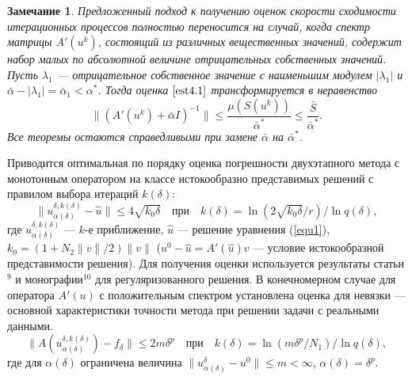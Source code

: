 \documentclass[%
autoref,     %
href,        %
colorlinks,  %
]{disser}
\newtheorem*{remark}{Замечание}
\begin{document}
\begin{remark}%
	Предложенный подход к получению оценок скорости сходимости итерационных процессов полностью переносится на случай, когда спектр матрицы $A'(u^k)$, состоящий из различных вещественных значений, содержит набор малых по абсолютной величине отрицательных собственных значений. Пусть $\lambda _1$ --- отрицательное собственное значение с наименьшим модулем $|\lambda_1|$ и $\bar\alpha -|\lambda _1|=\bar\alpha _1<\alpha^*$. Тогда оценка $\eqref{est4.1}$ 
	трансформируется в неравенство
	$$\|(A'(u^k)+\bar\alpha I)^{-1}\|\leqslant\frac{\mu(S(u^k))}{\bar\alpha^*}\leqslant\frac{\bar S}{\bar\alpha^*}.$$
	Все теоремы остаются справедливыми при замене $\bar\alpha$ на $\bar\alpha^*$.
\end{remark}

Приводится оптимальная по порядку оценка погрешности двухэтапного метода с монотонным оператором на классе истокообразно представимых решений с правилом выбора итераций $k(\delta)$:
\begin{equation*}
\|u_{\alpha(\delta)}^{\delta, k(\delta)}-\hat{u}\|\leqslant 4\sqrt{k_0 \delta}\quad \text{при}\quad k(\delta)={\ln(2\sqrt{k_0\delta}/r)}/{\ln q(\delta)},
\end{equation*}
где $u_{\alpha(\delta)}^{\delta, k(\delta)}$ --- $k$-е приближение, $\hat{u}$ --- решение уравнения (\ref{equ1}), $k_0=(1+N_2\|v\|/2)\|v\|$ ($u^0-\hat{u}=A'(\hat{u})v$ --- условие  истокообразной представимости решения). Для получения оценки используется результаты статьи$^{9}$ и монографии$^{10}$ для регуляризованного решения. В конечномерном случае для оператора $A'(u)$ с положительным спектром установлена оценка для невязки --- основной характеристики точности метода при решении задачи с реальными данными.
$$\|A(u_{\alpha(\delta)}^{\delta,k(\delta)})-f_\delta\|\leqslant 2m\delta^p \quad \text{при}\quad k(\delta)=\ln(m\delta^p/N_1)/\ln q(\delta),$$
где для $\alpha(\delta)$ ограничена величина $\|u_{\alpha(\delta)}^{\delta}-u^0\|\leqslant m <\infty$, $\alpha(\delta)=\delta^p$. 
{\scriptsize
\let\thefootnote\relax\let\thefootnote\relax{}
\let\thefootnote\relax\let\thefootnote\relax{}
}
\end{document}
